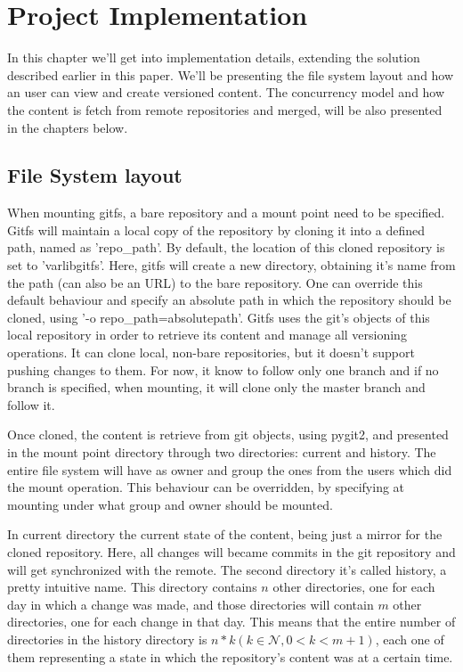 \chapter{Project Implementation}

\label{ch:fslayout}

In this chapter we'll get into implementation details, extending the solution described earlier in this paper. We'll be presenting the file system layout and how an user can view and create versioned content. The concurrency model and how the content is fetch from remote repositories and merged, will be also presented in the chapters below.

\section{File System layout}
When mounting gitfs, a bare repository and a mount point need to be specified. Gitfs will maintain a local copy of the repository by cloning it into a defined path, named as 'repo\_path'. By default, the location of this cloned repository is set to '\/var\/lib\/gitfs'. Here, gitfs will create a new directory, obtaining it's name from the path (can also be an URL) to the bare repository. One can override this default behaviour and specify an absolute path in which the repository should be cloned, using '-o repo\_path=\/absolute\/path\/'. Gitfs uses the git's objects of this local repository in order to retrieve its content and manage all versioning operations. It can clone local, non-bare repositories, but it doesn't support pushing changes to them. For now, it know to follow only one branch and if no branch is specified, when mounting, it will clone only the master branch and follow it.

Once cloned, the content is retrieve from git objects, using pygit2, and presented in the mount point directory through two directories: current and history. The entire file system will have as owner and group the ones from the users which did the mount operation. This behaviour can be overridden, by specifying at mounting under what group and owner should be mounted. 

In current directory the current state of the content, being just a mirror for the cloned repository. Here, all changes will became commits in the git repository and will get synchronized with the remote. The second directory it's called history, a pretty intuitive name. This directory contains $n$ other directories, one for each day in which a change was made, and those directories will contain $m$ other directories, one for each change in that day. This means that the entire number of directories in the history directory is $n*k (k \in \mathcal{N}, 0<k<m+1)$, each one of them representing a state in which the repository's content was at a certain time.

